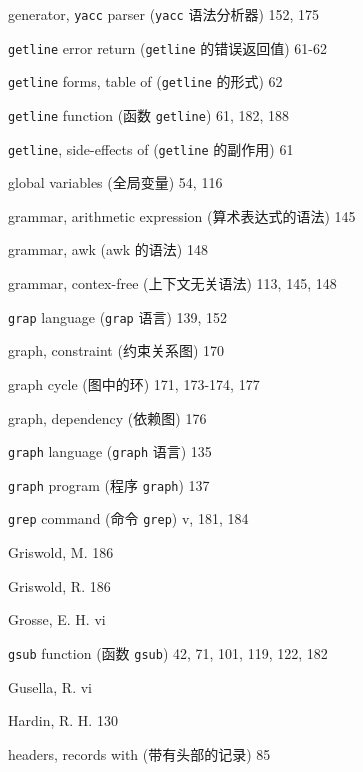 \begin{multicols}{2}
\hangindent=2pc  generator, \verb'yacc' parser (\verb'yacc'
语法分析器) 152, 175

\hangindent=2pc  \verb'getline' error return (\verb'getline'
的错误返回值) 61-62

\hangindent=2pc  \verb'getline' forms, table of (\verb'getline'
的形式) 62

\hangindent=2pc  \verb'getline' function (函数 \verb'getline')
61, 182, 188

\hangindent=2pc  \verb'getline', side-effects of
(\verb'getline' 的副作用) 61

\hangindent=2pc  global variables (全局变量) 54, 116

\hangindent=2pc  grammar, arithmetic expression
(算术表达式的语法) 145

\hangindent=2pc  grammar, awk (awk 的语法) 148

\hangindent=2pc  grammar, contex-free (上下文无关语法) 113, 145, 148

\hangindent=2pc  \verb'grap' language (\verb'grap' 语言) 139, 152

\hangindent=2pc  graph, constraint (约束关系图) 170

\hangindent=2pc  graph cycle (图中的环) 171, 173-174, 177

\hangindent=2pc  graph, dependency (依赖图) 176

\hangindent=2pc  \verb'graph' language (\verb'graph' 语言) 135

\hangindent=2pc  \verb'graph' program (程序 \verb'graph') 137

\hangindent=2pc  \verb'grep' command (命令 \verb'grep') v, 181, 184

\hangindent=2pc  Griswold, M. 186

\hangindent=2pc  Griswold, R. 186

\hangindent=2pc  Grosse, E. H. vi

\hangindent=2pc  \verb'gsub' function (函数 \verb'gsub')
42, 71, 101, 119, 122, 182

\hangindent=2pc  Gusella, R. vi


\hangindent=2pc  Hardin, R. H. 130

\hangindent=2pc  headers, records with (带有头部的记录) 85


\end{multicols}
